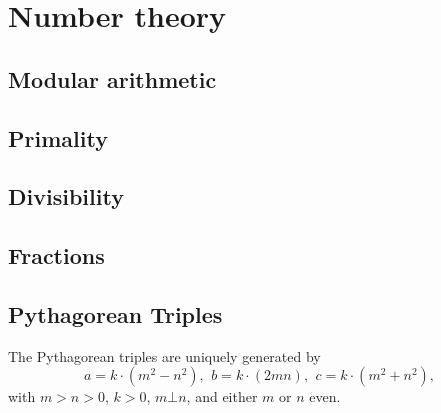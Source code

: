 \section{Number theory}

\subsection{Modular arithmetic}

\subsection{Primality}

\subsection{Divisibility}



\subsection{Fractions}

\subsection{Pythagorean Triples}
 The Pythagorean triples are uniquely generated by
 \[ a=k\cdot (m^{2}-n^{2}),\ \,b=k\cdot (2mn),\ \,c=k\cdot (m^{2}+n^{2}), \]
 with $m > n > 0$, $k > 0$, $m \bot n$, and either $m$ or $n$ even.

